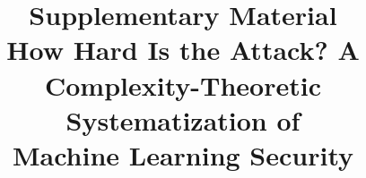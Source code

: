 \documentclass[conference,compsoc]{IEEEtran}
\begin{document}
\title{Supplementary Material\\
How Hard Is the Attack? A Complexity-Theoretic Systematization of\\
Machine Learning Security}
\author{
}
\maketitle
\nocite{*}

\onecolumn


\twocolumn


\end{document}
